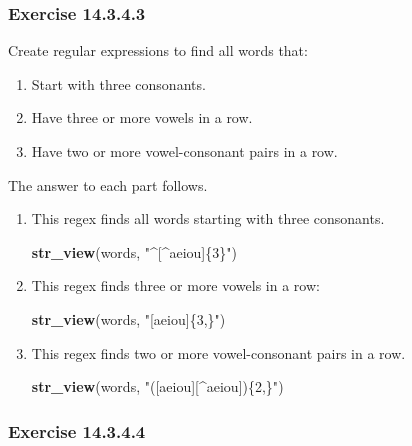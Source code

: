 \documentclass[]{book}
\newenvironment{Shaded}{\begin{snugshade}}{\end{snugshade}}
\newcommand{\KeywordTok}[1]{\textcolor[rgb]{0.13,0.29,0.53}{\textbf{#1}}}
\newcommand{\NormalTok}[1]{#1}
\newcommand{\StringTok}[1]{\textcolor[rgb]{0.31,0.60,0.02}{#1}}
\providecommand{\tightlist}{%
  \setlength{\itemsep}{0pt}\setlength{\parskip}{0pt}}
\theoremstyle{plain}
\theoremstyle{remark}
\theoremstyle{definition}
\theoremstyle{definition}
\theoremstyle{definition}
\theoremstyle{remark}
\begin{document}
\hypertarget{exercise-14.3.4.3}{%
\subsubsection*{\texorpdfstring{Exercise
{14.3.4.3}}{Exercise 14.3.4.3}}\label{exercise-14.3.4.3}}

Create regular expressions to find all words that:

\begin{enumerate}
\def\labelenumi{\arabic{enumi}.}
\tightlist
\item
  Start with three consonants.
\item
  Have three or more vowels in a row.
\item
  Have two or more vowel-consonant pairs in a row.
\end{enumerate}

The answer to each part follows.

\begin{enumerate}
\def\labelenumi{\arabic{enumi}.}
\item
  This regex finds all words starting with three consonants.

\begin{Shaded}
\begin{Highlighting}[]
\KeywordTok{str_view}\NormalTok{(words, }\StringTok{"^[^aeiou]\{3\}"}\NormalTok{)}
\end{Highlighting}
\end{Shaded}
\item
  This regex finds three or more vowels in a row:

\begin{Shaded}
\begin{Highlighting}[]
\KeywordTok{str_view}\NormalTok{(words, }\StringTok{"[aeiou]\{3,\}"}\NormalTok{)}
\end{Highlighting}
\end{Shaded}
\item
  This regex finds two or more vowel-consonant pairs in a row.

\begin{Shaded}
\begin{Highlighting}[]
\KeywordTok{str_view}\NormalTok{(words, }\StringTok{"([aeiou][^aeiou])\{2,\}"}\NormalTok{)}
\end{Highlighting}
\end{Shaded}
\end{enumerate}

\hypertarget{exercise-14.3.4.4}{%
\subsubsection*{\texorpdfstring{Exercise
{14.3.4.4}}{Exercise 14.3.4.4}}\label{exercise-14.3.4.4}}
\end{document}
